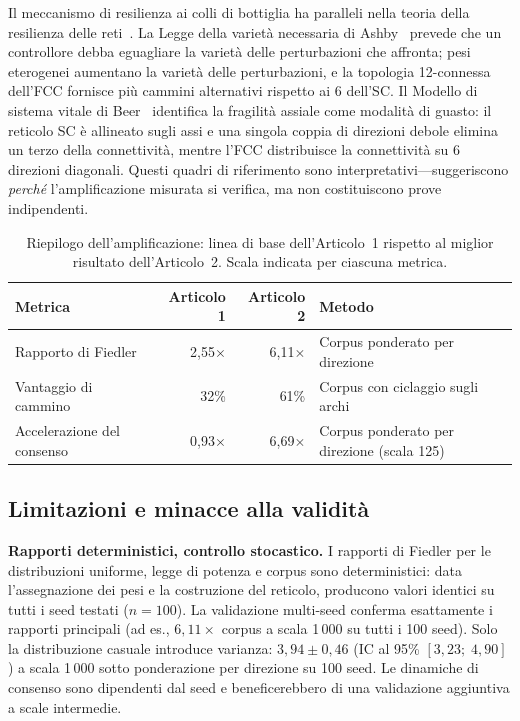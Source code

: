 \documentclass[11pt]{article}
\begin{document}
Il meccanismo di resilienza ai colli di bottiglia ha paralleli nella
teoria della resilienza delle reti~\cite{dorogovtsev2008}. La Legge
della variet\`a necessaria di Ashby~\cite{ashby1956} prevede che un
controllore debba eguagliare la variet\`a delle perturbazioni che
affronta; pesi eterogenei aumentano la variet\`a delle perturbazioni,
e la topologia 12-connessa dell'FCC fornisce pi\`u cammini
alternativi rispetto ai 6 dell'SC. Il Modello di sistema vitale di
Beer~\cite{beer1972} identifica la fragilit\`a assiale come modalit\`a
di guasto: il reticolo SC \`e allineato sugli assi e una singola coppia
di direzioni debole elimina un terzo della connettivit\`a, mentre
l'FCC distribuisce la connettivit\`a su 6 direzioni diagonali. Questi
quadri di riferimento sono interpretativi---suggeriscono \emph{perch\'e}
l'amplificazione misurata si verifica, ma non costituiscono prove
indipendenti.

\begin{table}[H]
\centering
\caption{Riepilogo dell'amplificazione: linea di base dell'Articolo~1
  rispetto al miglior risultato dell'Articolo~2. Scala indicata per
  ciascuna metrica.}
\label{tab:summary}
\begin{tabular}{lrrl}
\toprule
Metrica & Articolo 1 & Articolo 2 & Metodo \\
\midrule
Rapporto di Fiedler      & 2,55$\times$ & 6,11$\times$ & Corpus ponderato per direzione \\
Vantaggio di cammino     & 32\%         & 61\%         & Corpus con ciclaggio sugli archi \\
Accelerazione del consenso  & 0,93$\times$ & 6,69$\times$ & Corpus ponderato per direzione (scala 125) \\
\bottomrule
\end{tabular}
\end{table}

\subsection{Limitazioni e minacce alla validit\`a}

\textbf{Rapporti deterministici, controllo stocastico.} I rapporti di
Fiedler per le distribuzioni uniforme, legge di potenza e corpus sono
deterministici: data l'assegnazione dei pesi e la costruzione del
reticolo, producono valori identici su tutti i seed testati
($n = 100$). La validazione multi-seed conferma esattamente i rapporti
principali (ad es., $6{,}11\times$ corpus a scala 1\,000 su tutti i
100 seed). Solo la distribuzione casuale introduce varianza:
$3{,}94 \pm 0{,}46$ (IC al 95\% $[3{,}23;\; 4{,}90]$) a scala 1\,000
sotto ponderazione per direzione su 100 seed. Le dinamiche di consenso
sono dipendenti dal seed e beneficerebbero di una validazione aggiuntiva
a scale intermedie.
\end{document}
